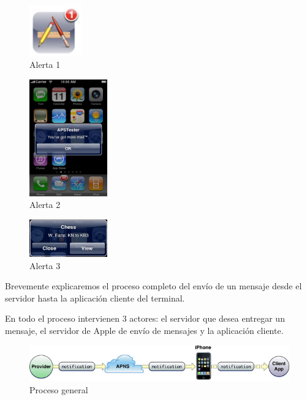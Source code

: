      \begin{figure}[h!]
    \centering
       \includegraphics[width=0.2\textwidth]{./images/badged_app.jpg}
     \caption{Alerta 1 }
   \label{fig:Alerta 1}
\end{figure}

\begin{figure}[h!]
    \centering
       \includegraphics[width=0.3\textwidth]{./images/notif_msg_one_button.jpg}
     \caption{Alerta 2 }
   \label{fig:Alerta 2}
\end{figure}

\begin{figure}[h!]
    \centering
       \includegraphics[width=0.3\textwidth]{./images/alert.jpg}
     \caption{Alerta 3 }
   \label{fig:Alerta 3}
\end{figure}

     
    Brevemente explicaremos el proceso completo del envío de un mensaje desde el servidor hasta la aplicación cliente del terminal. 
    
    En todo el proceso intervienen 3 actores: el servidor que desea entregar un mensaje, el servidor de Apple de envío de mensajes y la aplicación cliente.
    
 \begin{figure}[h!]
    \centering
       \includegraphics[width=0.95\linewidth]{./images/remote_notif_simple.jpg}
     \caption{Proceso general }
   \label{fig:Notificacion proceso}
\end{figure}

